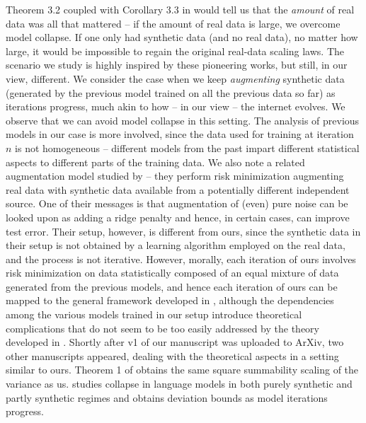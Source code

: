 Theorem 3.2 coupled with Corollary 3.3 in \cite{dohmatob2024tale} would tell us that the \textit{amount} of real data was all that mattered -- if the amount of real data is large, we overcome model collapse. If one only had synthetic data (and no real data), no matter how large, it would be impossible to regain the original real-data scaling laws.
The scenario we study is highly inspired by these pioneering works, but still, in our view, different. We consider the case when we keep \textit{augmenting} synthetic data (generated by the previous model trained on all the previous data so far) as iterations progress, much akin to how -- in our view -- the internet evolves. We observe that we can avoid model collapse in this setting. The analysis of previous models in our case is more involved, since the data used for training at iteration $n$ is not homogeneous -- different models from the past impart different statistical aspects to different parts of the training data. We also note a related augmentation model studied by \cite{jain2024scaling} -- they perform risk minimization augmenting real data with synthetic data available from a potentially different independent source. One of their messages is that augmentation of (even) pure noise can be looked upon as adding a ridge penalty and hence, in certain cases, can improve test error. Their setup, however, is different from ours, since the synthetic data in their setup is not obtained by a learning algorithm employed on the real data, and the process is not iterative. However, morally, each iteration of ours involves risk minimization on data statistically composed of an equal mixture of data generated from the previous models, and hence each iteration of ours can be mapped to the general framework developed in \cite{jain2024scaling}, although the dependencies among the various models trained in our setup introduce theoretical complications that do not seem to be too easily addressed by the theory developed in \cite{jain2024scaling}. Shortly after v1 of our manuscript was uploaded to ArXiv, two other manuscripts appeared, dealing with the theoretical aspects in a setting similar to ours. Theorem 1 of \cite{marchi2024heat} obtains the same square summability scaling of the variance as us. \cite{seddik2024bad} studies collapse in language models in both purely synthetic and partly synthetic regimes and obtains deviation bounds as model iterations progress.

